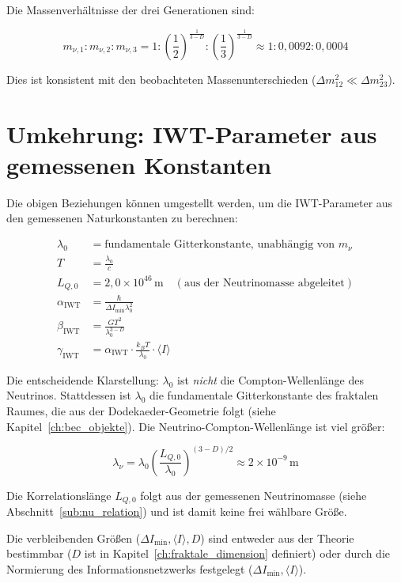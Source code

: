 Die Massenverhältnisse der drei Generationen sind:

\[
m_{\nu,1} : m_{\nu,2} : m_{\nu,3} = 1 : \left(\frac{1}{2}\right)^{\frac{1}{3-D}} : \left(\frac{1}{3}\right)^{\frac{1}{3-D}} \approx 1 : 0{,}0092 : 0{,}0004
\]

Dies ist konsistent mit den beobachteten Massenunterschieden (\( \Delta m_{12}^2 \ll \Delta m_{23}^2 \)).

\section{Umkehrung: IWT-Parameter aus gemessenen Konstanten}
\label{sec:umkehrung}

Die obigen Beziehungen können umgestellt werden, um die IWT-Parameter aus den gemessenen Naturkonstanten zu berechnen:

\[
\begin{aligned}
\lambda_0 &= \text{fundamentale Gitterkonstante, unabhängig von } m_\nu \\[4pt]
T &= \frac{\lambda_0}{c} \\[4pt]
L_{Q,0} &= 2{,}0 \times 10^{46} \, \text{m} \quad (\text{aus der Neutrinomasse abgeleitet}) \\[4pt]
\alpha_{\text{IWT}} &= \frac{\hbar}{\Delta I_{\min} \lambda_0^2} \\[4pt]
\beta_{\text{IWT}} &= \frac{G T^2}{\lambda_0^{3-D}} \\[4pt]
\gamma_{\text{IWT}} &= \alpha_{\text{IWT}} \cdot \frac{k_B T}{\lambda_0} \cdot \langle I \rangle
\end{aligned}
\]

Die entscheidende Klarstellung: \( \lambda_0 \) ist \emph{nicht} die Compton-Wellenlänge des Neutrinos. Stattdessen ist \( \lambda_0 \) die fundamentale Gitterkonstante des fraktalen Raumes, die aus der Dodekaeder-Geometrie folgt (siehe Kapitel~\ref{ch:bec_objekte}). Die Neutrino-Compton-Wellenlänge ist viel größer:

\[
\lambda_\nu = \lambda_0 \left( \frac{L_{Q,0}}{\lambda_0} \right)^{(3-D)/2} \approx 2 \times 10^{-9} \, \text{m}
\]

Die Korrelationslänge \( L_{Q,0} \) folgt aus der gemessenen Neutrinomasse (siehe Abschnitt~\ref{sub:nu_relation}) und ist damit keine frei wählbare Größe.

Die verbleibenden Größen (\( \Delta I_{\min}, \langle I \rangle, D \)) sind entweder aus der Theorie bestimmbar (\( D \) ist in Kapitel~\ref{ch:fraktale_dimension} definiert) oder durch die Normierung des Informationsnetzwerks festgelegt (\( \Delta I_{\min}, \langle I \rangle \)).

